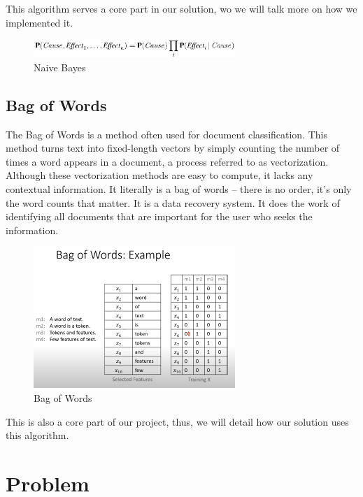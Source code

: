 \documentclass[sigconf,12pt,review=false,natbib=false]{acmart}
\begin{document}
This algorithm serves a core part in our solution, wo we will talk more on how we implemented it. \\

\begin{figure}[h!]
    \centering
    \includegraphics[width=3in]{naive_bayes}
    \caption{Naive Bayes}
    \label{fig:naive_bayes}
\end{figure}

\subsection{Bag of Words}

The Bag of Words is a method often used for document classification. This method turns text into fixed-length
vectors by simply counting the number of times a word appears in a document, a process referred to as vectorization. \\

Although these vectorization methods are easy to compute, it lacks any contextual information. It literally is a bag
of words – there is no order, it’s only the word counts that matter. It is a data recovery
system. It does the work of identifying all documents that are important for the user who  seeks the information. \\

\begin{figure}[h!]
    \centering
    \includegraphics[width=3in]{bow}
    \caption{Bag of Words}
    \label{fig:bow}
\end{figure}

This is also a core part of our project, thus, we will detail how our solution uses this algorithm. \\

\section{Problem}
\end{document}
